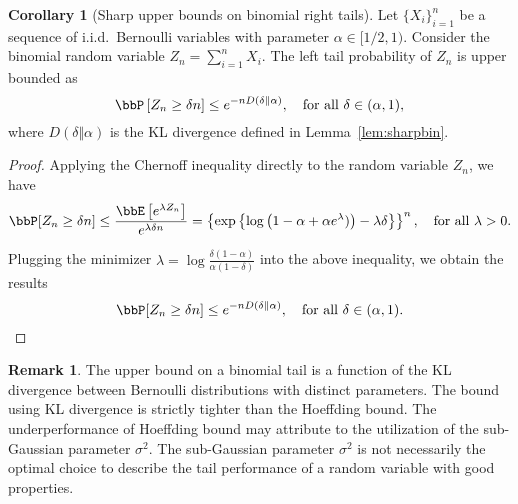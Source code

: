 \documentclass[11pt]{article}
\newcommand{\of}[1]{\left(#1\right)}
\newcommand{\off}[1]{\left[#1\right]}
\newcommand{\offf}[1]{\left\{#1\right\}}
\theoremstyle{plain}
\theoremstyle{definition}
\newtheorem{cor}{Corollary}
\newtheorem{rmk}{Remark}
\begin{document}
\begin{cor}[Sharp upper bounds on binomial right tails] Let $\{X_i\}_{i=1}^n$ be a sequence of i.i.d.\ Bernoulli variables with parameter $\alpha \in [1/2,1)$. Consider the binomial random variable $Z_n = \sum_{i=1}^n X_i$. The left tail probability of $Z_n$ is upper bounded as
	\begin{equation}\label{eq:lembinupper}
		\bbP\off{Z_n \geq \delta n} \leq e^{-n D\of{\delta \Vert \alpha}}, \quad \text{for all }\delta \in (\alpha,1),
	\end{equation}
	where $ D\of{\delta \Vert \alpha}$ is the KL divergence defined in Lemma~\ref{lem:sharpbin}.
\end{cor}

\begin{proof}
	Applying the Chernoff inequality directly to the random variable $Z_n$, we have
	 \begin{equation}
    	\bbP[Z_n \geq \delta n] \leq \frac{\bbE\off{e^{\lambda Z_n}}}{e^{\lambda \delta n}} = \offf {\exp \offf{\log \of{1 - \alpha + \alpha e^{\lambda})}- \lambda \delta }}^n,\quad \text{for all } \lambda >0.
    \end{equation}
    
    Plugging the minimizer $\lambda = \log {\frac{\delta(1-\alpha)}{\alpha(1 - \delta)}}$ into the above inequality, we obtain the results
    \[ \bbP[Z_n \geq \delta n]  \leq e^{-n D\of{\delta \Vert \alpha}}, \quad \text{for all }\delta \in (\alpha,1).\]

\end{proof}

\begin{rmk}
	The upper bound on a binomial tail is a function of the KL divergence between Bernoulli distributions with distinct parameters. The bound using KL divergence is strictly tighter than the Hoeffding bound. The underperformance of Hoeffding bound may attribute to the utilization of the sub-Gaussian parameter $\sigma^2$. The sub-Gaussian parameter $\sigma^2$ is not necessarily the optimal choice to describe the tail performance of a random variable with good properties. 
\end{rmk}
\end{document}
